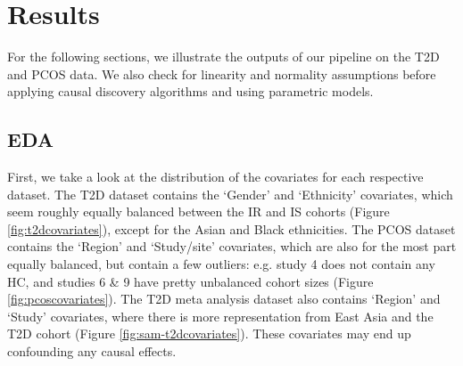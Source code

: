 \documentclass[12pt,letterpaper]{article}
\begin{document}
\section{Results}

For the following sections, we illustrate the outputs of our pipeline on the T2D and PCOS data. We also check for linearity and normality assumptions before applying causal discovery algorithms and using parametric models. 

\subsection{EDA}

First, we take a look at the distribution of the covariates for each respective dataset. The T2D dataset contains the ‘Gender’ and ‘Ethnicity’ covariates, which seem roughly equally balanced between the IR and IS cohorts (Figure \ref{fig:t2dcovariates}), except for the Asian and Black ethnicities. The PCOS dataset contains the ‘Region’ and ‘Study/site’ covariates, which are also for the most part equally balanced, but contain a few outliers: e.g. study 4 does not contain any HC, and studies 6 \& 9 have pretty unbalanced cohort sizes (Figure \ref{fig:pcoscovariates}). The T2D meta analysis dataset also contains `Region' and `Study' covariates, where there is more representation from East Asia and the T2D cohort (Figure \ref{fig:sam-t2dcovariates}). These covariates may end up confounding any causal effects. 
\end{document}
